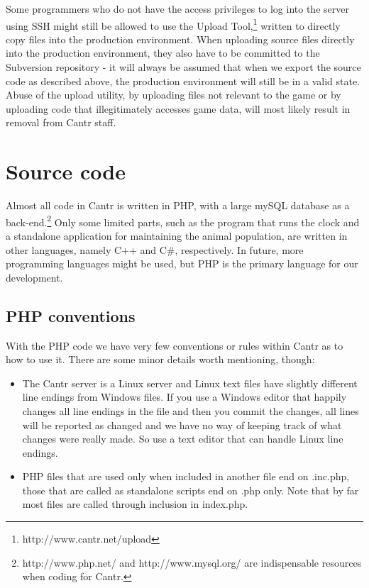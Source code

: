 \documentclass[a4paper,12pt]{article}
\begin{document}
Some programmers who do not have the access privileges to log into the server using SSH might still be allowed to use the Upload Tool,\footnote{http://www.cantr.net/upload} written to directly copy files into the production environment. When uploading source files directly into the production environment, they also have to be committed to the Subversion repository - it will always be assumed that when we export the source code as described above, the production environment will still be in a valid state. Abuse of the upload utility, by uploading files not relevant to the game or by uploading code that illegitimately accesses game data, will most likely result in removal from Cantr staff.


\section{Source code}

Almost all code in Cantr is written in PHP, with a large mySQL database as a back-end.\footnote{http://www.php.net/ and http://www.mysql.org/ are indispensable resources when coding for Cantr.} Only some limited parts, such as the program that runs the clock and a standalone application for maintaining the animal population, are written in other languages, namely C++ and C\#, respectively. In future, more programming languages might be used, but PHP is the primary language for our development.

\subsection{PHP conventions}

With the PHP code we have very few conventions or rules within Cantr as to how to use it. There are some minor details worth mentioning, though:
\begin{itemize}
\item The Cantr server is a Linux server and Linux text files have slightly different line endings from Windows files. If you use a Windows editor that happily changes all line endings in the file and then you commit the changes, all lines will be reported as changed and we have no way of keeping track of what changes were really made. So use a text editor that can handle Linux line endings.
\item PHP files that are used only when included in another file end on .inc.php, those that are called as standalone scripts end on .php only. Note that by far most files are called through inclusion in index.php.
\end{itemize}
\end{document}
